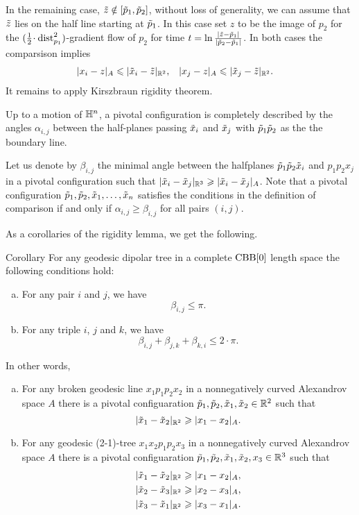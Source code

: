 In the remaining case, $\~z\notin [\~p_1,\~p_2]$, without loss of generality, we can assume that $\~z$ lies on the half line starting at $\~p_1$.
In this case set $z$ to be the image of $p_2$ for the $(\tfrac12\cdot \dist_{p_1}^2)$-gradient flow of $p_2$ for time $t=\ln \tfrac{|\~z-\~p_1|}{|\~p_2-\~p_1|}$.
In both cases the comparsison implies 
\begin{align*}
|x_i-z|_A &\le |\~x_i-\~z|_{\RR^2},
&
|x_j-z|_A &\le |\~x_j-\~z|_{\RR^2}.
\end{align*}
It remains to apply Kirszbraun rigidity theorem.
\qeds


Up to a motion of $\HH^n$, a pivotal configuration is completely described by the angles $\alpha_{i,j}$ between the half-planes passing $\~x_i$ and $\~x_j$ with $\~p_1 \~p_2$ as the the boundary line.

Let us denote by $\beta_{i,j}$ the minimal angle between the halfplanes $\~p_1 \~p_2 \~x_i$ and $p_1p_2 x_j$ in a pivotal configuration such that $|\~x_i-\~x_j|_{\RR^3}\ge|\~x_i-\~x_j|_A$. 
Note that a pivotal  configuration $\~p_1,\~p_2,\~x_1,\dots,\~x_n$ satisfies the conditions in the definition of comparison if and only if $\alpha_{i,j}\ge \beta_{i,j}$ for all pairs $(i,j)$.

As a corollaries of the rigidity lemma, we get the following.

\begin{thm}{Corollary}\label{cor:|x-x|}
For any geodesic dipolar tree  in a complete $\CBB[0]$ length space the following conditions hold:
\begin{enumerate}[(a)]
\item For any pair $i$ and $j$, we have
\[\beta_{i,j}\le \pi.\]
\item For any triple $i$, $j$ and $k$,  we have
\[\beta_{i,j}+\beta_{j,k}+\beta_{k,i}\le 2\cdot\pi.\]
\end{enumerate}
In other words, 
\begin{enumerate}[(a)]
\item For any broken geodesic line $x_1p_1p_2x_2$ in a nonnegatively curved Alexandrov space $A$ there is a pivotal configuaration $\~p_1,\~p_2,\~x_1,\~x_2\in \RR^2$ such that 
\[|\~x_1-\~x_2|_{\RR^2}\ge |x_1-x_2|_A.\]
\item For any geodesic (2-1)-tree $x_1x_2p_1p_2x_3$ in a nonnegatively curved Alexandrov space $A$ there is a pivotal configuaration $\~p_1,\~p_2,\~x_1,\~x_2,x_3\in \RR^3$ such that 
\begin{align*}
|\~x_1-\~x_2|_{\RR^2}&\ge |x_1-x_2|_A,
\\
|\~x_2-\~x_3|_{\RR^2}&\ge |x_2-x_3|_A,
\\
|\~x_3-\~x_1|_{\RR^2}&\ge |x_3-x_1|_A.
\end{align*}
\end{enumerate}

\end{thm}

